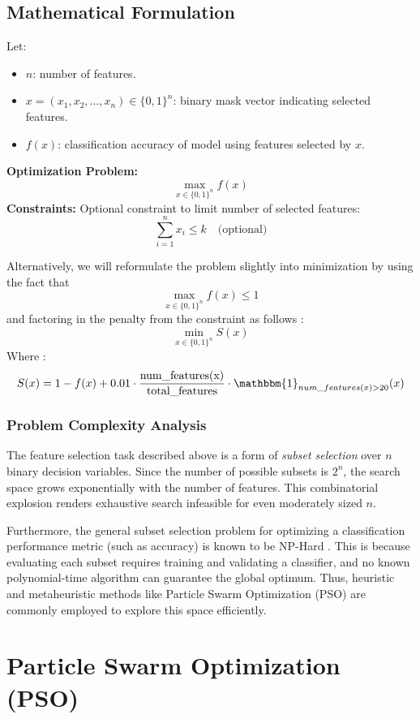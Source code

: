 \documentclass[12pt]{article}
\begin{document}
\subsection{Mathematical Formulation}
Let:
\begin{itemize}
    \item \( n \): number of features.
    \item \( x = (x_1, x_2, \dots, x_n) \in \{0, 1\}^n \): binary mask vector indicating selected features.
    \item \( f(x) \): classification accuracy of model using features selected by \( x \).
\end{itemize}
\textbf{Optimization Problem:}
\[
\max_{x \in \{0,1\}^n} f(x)
\]
\textbf{Constraints:} Optional constraint to limit number of selected features:
\[
\sum_{i=1}^n x_i \leq k \quad \text{(optional)}
\]

Alternatively, we will reformulate the problem slightly into minimization by using the fact that \[ \max_{x \in \{0,1\}^n} f(x) \leq 1 \] and factoring in the penalty from the constraint as follows :
$$ \min_{x \in \{0,1\}^n} S(x) $$
Where : 
$$ S(x) =  1 - f(x) + 0.01\cdot \frac{\text{num\_features(x)}}{\text{total\_features}} \cdot \mathbbm{1}_{num\_features(x) > 20}(x) $$

\subsubsection*{Problem Complexity Analysis}
The feature selection task described above is a form of \textit{subset selection} over \( n \) binary decision variables. Since the number of possible subsets is \( 2^n \), the search space grows exponentially with the number of features. This combinatorial explosion renders exhaustive search infeasible for even moderately sized \( n \).

Furthermore, the general subset selection problem for optimizing a classification performance metric (such as accuracy) is known to be NP-Hard \cite{blum1992npcomplete}. This is because evaluating each subset requires training and validating a classifier, and no known polynomial-time algorithm can guarantee the global optimum. Thus, heuristic and metaheuristic methods like Particle Swarm Optimization (PSO) are commonly employed to explore this space efficiently.

\section{Particle Swarm Optimization (PSO)}
\end{document}
